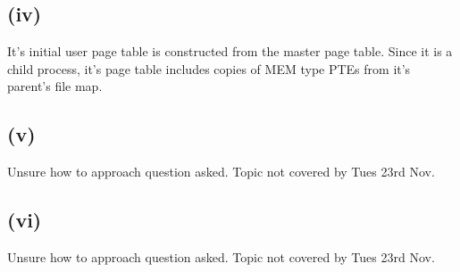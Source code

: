 \documentclass[a4paper,12pt]{article}
\begin{document}
\subsection*{(iv)}

It's initial user page table is constructed from the master page table.
Since it is a child process, it's page table includes copies of MEM type
PTEs from it's parent's file map.

\subsection*{(v)}

Unsure how to approach question asked. Topic not covered by Tues 23rd
Nov.

\subsection*{(vi)}

Unsure how to approach question asked. Topic not covered by Tues 23rd
Nov.
\end{document}
